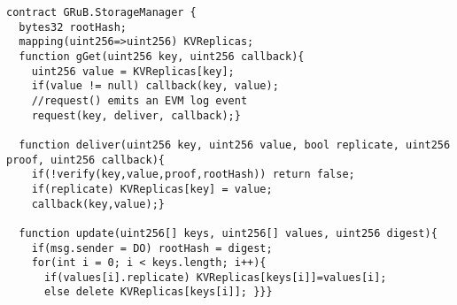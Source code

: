 \begin{lstlisting}
contract GRuB.StorageManager {
  bytes32 rootHash;
  mapping(uint256=>uint256) KVReplicas;
  function gGet(uint256 key, uint256 callback){
    uint256 value = KVReplicas[key];
    if(value != null) callback(key, value);
    //request() emits an EVM log event
    request(key, deliver, callback);}

  function deliver(uint256 key, uint256 value, bool replicate, uint256 proof, uint256 callback){
    if(!verify(key,value,proof,rootHash)) return false;
    if(replicate) KVReplicas[key] = value;
    callback(key,value);}

  function update(uint256[] keys, uint256[] values, uint256 digest){
    if(msg.sender = DO) rootHash = digest;
    for(int i = 0; i < keys.length; i++){
      if(values[i].replicate) KVReplicas[keys[i]]=values[i];
      else delete KVReplicas[keys[i]]; }}}
\end{lstlisting}
